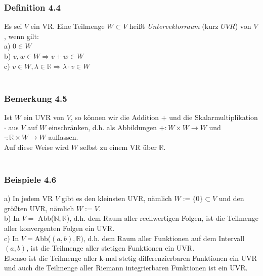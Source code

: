 \documentclass{article}
\begin{document}
\subsubsection*{Definition 4.4}
Es sei $V$ ein VR. Eine Teilmenge $W \subset V$ heißt \textit{Untervektorraum} (kurz $\textit{UVR}$) von $V$, wenn gilt: \\
a) $0 \in W$ \\
b) $v,w \in W \Rightarrow v+w \in W$ \\
c) $v \in W, \lambda \in \mathbb{R} \Rightarrow \lambda \cdot v \in W$ \\
\\
\subsubsection*{Bemerkung 4.5}
Ist $W$ ein UVR von $V$, so können wir die Addition $+$ und die Skalarmultiplikation $\cdot$ aus $V$ auf $W$ einschränken, d.h. als Abbildungen $+: W \times W \rightarrow W$ und $\cdot: \mathbb{R} \times W \rightarrow W$ auffassen. \\
Auf diese Weise wird $W$ selbst zu einem VR über $\mathbb{R}$. \\
\\
\subsubsection*{Beispiele 4.6}
a) In jedem VR $V$ gibt es den kleinsten UVR, nämlich $W:= \{0\} \subset V$ und den größten UVR, nämlich $W:= V$. \\
b) In $V =$ Abb($\mathbb{N}, \mathbb{R}$), d.h. dem Raum aller reellwertigen Folgen, ist die Teilmenge aller konvergenten Folgen ein UVR. \\
c) In $V = $Abb($(a,b), \mathbb{R})$, d.h. dem Raum aller Funktionen auf dem Intervall $(a,b)$, ist die Teilmenge aller stetigen Funktionen ein UVR. \\
Ebenso ist die Teilmenge aller k-mal stetig differenzierbaren Funktionen ein UVR und auch die Teilmenge aller Riemann integrierbaren Funktionen ist ein UVR. \\
\\
\end{document}
